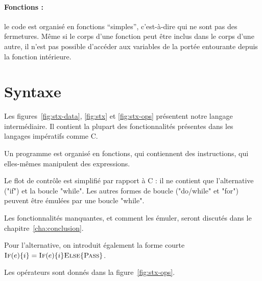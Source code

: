 \paragraph{Fonctions :} le code est organisé en fonctions ``simples'',
c'est-à-dire qui ne sont pas des fermetures. Même si le corps
d'une fonction peut être inclus dans le corps d'une autre, il n'est pas possible
d'accéder aux variables de la portée entourante depuis la fonction intérieure.

\section{Syntaxe}

Les figures~\ref{fig:stx-data}, \ref{fig:stx} et \ref{fig:stx-ops} présentent
notre langage intermédiaire. Il contient la plupart des fonctionnalités
présentes dans les langages impératifs comme C.

Un programme est organisé en fonctions, qui contiennent des instructions, qui
elles-mêmes manipulent des expressions.

Le flot de contrôle est simplifié par rapport à C : il ne contient que
l'alternative ("if") et la boucle "while". Les autres formes de boucle
("do/while" et "for") peuvent être émulées par une boucle "while".

Les fonctionnalités manquantes, et comment les émuler, seront discutés dans le
chapitre~\ref{cha:conclusion}. %

Pour l'alternative, on introduit également la forme courte $\textsc{If}(e) \{ i \} =
\textsc{If}(e) \{ i \} \textsc{Else} \{ \textsc{Pass} \}$.

Les opérateurs sont donnés dans la figure~\ref{fig:stx-ops}.


